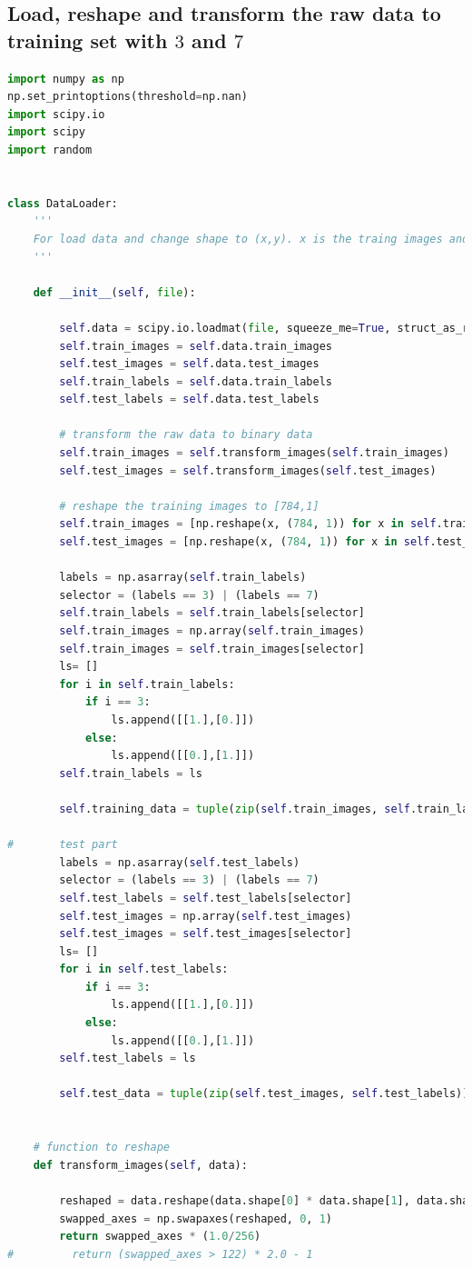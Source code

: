 \documentclass[12pt,a4paper]{article}
\begin{document}
\subsection{Load, reshape and transform the raw data to training set with $3$ and $7$}
\begin{lstlisting}[language=Python]
import numpy as np
np.set_printoptions(threshold=np.nan)
import scipy.io
import scipy
import random


class DataLoader:
    '''
    For load data and change shape to (x,y). x is the traing images and y is the label of the x.
    '''

    def __init__(self, file):

        self.data = scipy.io.loadmat(file, squeeze_me=True, struct_as_record=False)['mnist']
        self.train_images = self.data.train_images
        self.test_images = self.data.test_images
        self.train_labels = self.data.train_labels
        self.test_labels = self.data.test_labels

        # transform the raw data to binary data
        self.train_images = self.transform_images(self.train_images)
        self.test_images = self.transform_images(self.test_images)

        # reshape the training images to [784,1]
        self.train_images = [np.reshape(x, (784, 1)) for x in self.train_images]
        self.test_images = [np.reshape(x, (784, 1)) for x in self.test_images]

        labels = np.asarray(self.train_labels)
        selector = (labels == 3) | (labels == 7)
        self.train_labels = self.train_labels[selector]
        self.train_images = np.array(self.train_images)
        self.train_images = self.train_images[selector]
        ls= []
        for i in self.train_labels:
            if i == 3:
                ls.append([[1.],[0.]])
            else:
                ls.append([[0.],[1.]])
        self.train_labels = ls
        
        self.training_data = tuple(zip(self.train_images, self.train_labels))
        
#       test part
        labels = np.asarray(self.test_labels)
        selector = (labels == 3) | (labels == 7)
        self.test_labels = self.test_labels[selector]
        self.test_images = np.array(self.test_images)
        self.test_images = self.test_images[selector]
        ls= []
        for i in self.test_labels:
            if i == 3:
                ls.append([[1.],[0.]])
            else:
                ls.append([[0.],[1.]])
        self.test_labels = ls
        
        self.test_data = tuple(zip(self.test_images, self.test_labels))
        
        
    # function to reshape
    def transform_images(self, data):

        reshaped = data.reshape(data.shape[0] * data.shape[1], data.shape[2])
        swapped_axes = np.swapaxes(reshaped, 0, 1)
        return swapped_axes * (1.0/256)
#         return (swapped_axes > 122) * 2.0 - 1
\end{lstlisting}
\end{document}
